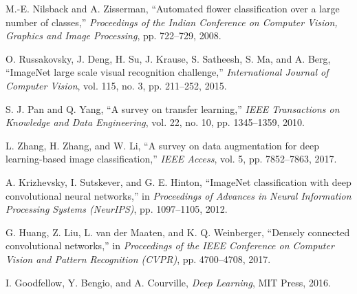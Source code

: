 \vspace{3cm}

\begin{thebibliography}{99}

 M.-E. Nilsback and A. Zisserman, ``Automated flower classification over a large number of classes,'' \textit{Proceedings of the Indian Conference on Computer Vision, Graphics and Image Processing}, pp. 722–729, 2008.

 O. Russakovsky, J. Deng, H. Su, J. Krause, S. Satheesh, S. Ma, and A. Berg, ``ImageNet large scale visual recognition challenge,'' \textit{International Journal of Computer Vision}, vol. 115, no. 3, pp. 211–252, 2015.

 S. J. Pan and Q. Yang, ``A survey on transfer learning,'' \textit{IEEE Transactions on Knowledge and Data Engineering}, vol. 22, no. 10, pp. 1345–1359, 2010.

 L. Zhang, H. Zhang, and W. Li, ``A survey on data augmentation for deep learning-based image classification,'' \textit{IEEE Access}, vol. 5, pp. 7852–7863, 2017.

 A. Krizhevsky, I. Sutskever, and G. E. Hinton, ``ImageNet classification with deep convolutional neural networks,'' in \textit{Proceedings of Advances in Neural Information Processing Systems (NeurIPS)}, pp. 1097–1105, 2012.

 G. Huang, Z. Liu, L. van der Maaten, and K. Q. Weinberger, ``Densely connected convolutional networks,'' in \textit{Proceedings of the IEEE Conference on Computer Vision and Pattern Recognition (CVPR)}, pp. 4700–4708, 2017.

 I. Goodfellow, Y. Bengio, and A. Courville, \textit{Deep Learning}, MIT Press, 2016.

\end{thebibliography}























